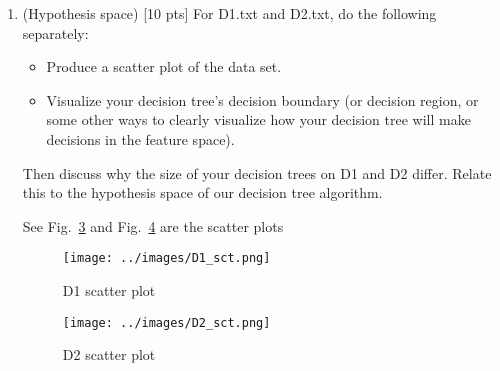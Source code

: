 \documentclass[a4paper]{article}
\theoremstyle{definition}
\newenvironment{soln}{
    \leavevmode\color{blue}\ignorespaces
}{}
\begin{document}
\begin{enumerate}
\begin{soln}
  See Fig.~\ref{fig:D1} for the tree and the rules that are followed for the D1 data. We split on feature 2 and then we are able to directly classify the entire data. This means that the decision boundary is a line $x_2 = 0.201829$.
  \begin{figure}[H]
    \centering
    \texttt{[image: ../images/D1.png]}
    \caption{D1 Decision tree}
    \label{fig:D1}
  \end{figure}

  See Fig.~\ref{fig:D2} for the tree and the rules that are followed for the D2 data. It is impossible to interpret the decision boundary from the tree. This is because the tree is too complex and the decision boundary is not a simple line or a simple curve.
  \begin{figure}[H]
    \centering
    \texttt{[image: ../images/D2.png]}
    \caption{D2 Decision tree}
    \label{fig:D2}
  \end{figure}
\end{soln}

\item (Hypothesis space)  [10 pts] For D1.txt and D2.txt, do the following separately:
  \begin{itemize}
  
  \item Produce a scatter plot of the data set.

  \item Visualize your decision tree's decision boundary (or decision region, or some other ways to clearly visualize how your decision tree will make decisions in the feature space).

  \end{itemize}
    Then discuss why the size of your decision trees on D1 and D2 differ.  Relate this to the hypothesis space of our decision tree algorithm. \\

\begin{soln}
      See Fig.~\ref{fig:D1_sct} and Fig.~\ref{fig:D2_sct} are the scatter plots

    \begin{figure}[H]
        \centering
        \texttt{[image: ../images/D1\_sct.png]}
        \caption{D1 scatter plot}
        \label{fig:D1_sct}
      \end{figure}

      \begin{figure}[H]
        \centering
        \texttt{[image: ../images/D2\_sct.png]}
        \caption{D2 scatter plot}
        \label{fig:D2_sct}
    \end{figure}


\end{soln}
\end{enumerate}
\end{document}
